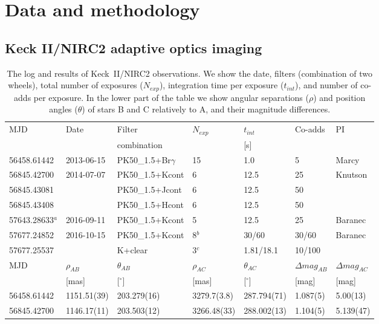 \documentclass{aa}
\begin{document}

\section{Data and methodology}

\subsection{Keck II/NIRC2 adaptive optics imaging}

\begin{table*}
\centering
\caption{The log and results of Keck~II/NIRC2 observations. We show the date, filters 
(combination of two wheels), 
total number of exposures ($N_{exp}$), integration time per exposure ($t_{int}$), and 
number of co-adds per exposure. In the lower part of the table we show angular separations
($\rho$) and position angles ($\theta$) of stars B and C relatively to A, and
their magnitude differences.}\label{tab_ao_obslog}
\begin{tabular}{lllllll}
\hline \hline 
MJD & Date & Filter & $N_{exp}$ & $t_{int}$ & Co-adds & PI \\ 
 & & combination & & [s] & & \\
\hline 
56458.61442	& 2013-06-15	& PK50\_1.5+Br$\gamma$	& 15 &  1.0 &  5 & Marcy	\\
56845.42700	& 2014-07-07	& PK50\_1.5+Kcont	&  6 & 12.5 & 25 & Knutson	\\
56845.43081	& 		& PK50\_1.5+Jcont	&  6 & 12.5 & 50 &		\\
56845.43408	& 		& PK50\_1.5+Hcont	&  6 & 12.5 & 50 &		\\
57643.28633$^a$	& 2016-09-11	& PK50\_1.5+Kcont	&  5 & 12.5 & 25 & Baranec	\\
57677.24852	& 2016-10-15	& PK50\_1.5+Kcont	& 8$^b$& 30/60& 30/60&Baranec	\\
57677.25537	&		& K+clear 		& 3$^c$& 1.81/18.1& 10/100 &	\\
\hline \hline
MJD & $\rho_{AB}$ & $\theta_{AB}$ & $\rho_{AC}$ & $\theta_{AC}$ & $\Delta mag_{AB}$ & $\Delta mag_{AC}$ \\
& [mas] & [$^\circ$] & [mas] & [$^\circ$] & [mag] & [mag] \\ 
\hline
56458.61442	& 1151.51(39) & 203.279(16) & 3279.7(3.8) & 287.794(71) & 1.087(5) & 5.00(13) \\ 
56845.42700	& 1146.17(11) & 203.503(12) & 3266.48(33) & 288.002(13) & 1.104(5) & 5.139(47) \\ 

\end{tabular}
\end{table*}
\end{document}
